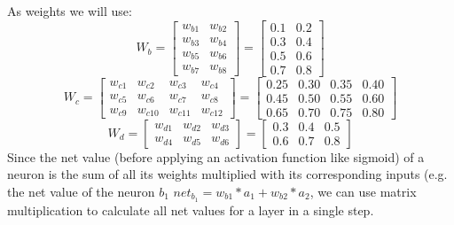\documentclass[11pt, halfparskip]{article}
\begin{document}
        \newpage
        As weights we will use:
        \[
        	 W_b =
            \begin{bmatrix}
            	w_{b1} & w_{b2}\\
            	w_{b3} & w_{b4}\\
            	w_{b5} & w_{b6}\\
            	w_{b7} & w_{b8}
            \end{bmatrix}
            =
            \begin{bmatrix}
            	0.1 & 0.2\\
            	0.3 & 0.4\\
            	0.5 & 0.6\\
            	0.7 & 0.8
            \end{bmatrix}
        \]
        \[
            W_c =
            \begin{bmatrix}
            	w_{c1} & w_{c2} & w_{c3} & w_{c4}\\
            	w_{c5} & w_{c6} & w_{c7} & w_{c8}\\
            	w_{c9} & w_{c10} & w_{c11} & w_{c12}
            \end{bmatrix}
            =
            \begin{bmatrix}
            	0.25 & 0.30 & 0.35 & 0.40\\
            	0.45 & 0.50 & 0.55 & 0.60\\
            	0.65 & 0.70 & 0.75 & 0.80
            \end{bmatrix}
        \]
        \[
            W_d =
            \begin{bmatrix}
            	w_{d1} & w_{d2} & w_{d3}\\
            	w_{d4} & w_{d5} & w_{d6}
            \end{bmatrix}
            =
            \begin{bmatrix}
            	0.3 & 0.4 & 0.5\\
            	0.6 & 0.7 & 0.8
            \end{bmatrix}
        \]
        Since the net value (before applying an activation function like sigmoid) of a neuron is the sum of all its weights multiplied with its corresponding inputs (e.g. the net value of the
        neuron $b_1$ $net_{b_1} = w_{b1} * a_1 + w_{b2} * a_2$, we can use matrix multiplication to calculate all net values for a layer in a single step.\\
\end{document}
